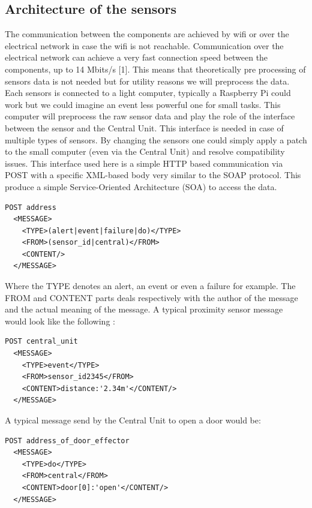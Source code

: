 \documentclass{acm_proc_article-sp}
\begin{document}
\subsection{Architecture of the sensors}
The communication between the components are achieved by wifi or over the electrical network in case the wifi is not reachable. 
Communication over the electrical network can achieve a very fast connection speed between the components, up to 14 Mbits/s [1]. 
This means that theoretically pre processing of sensors data is not needed but for utility reasons we will preprocess the data.
Each sensors is connected to a light computer, typically a Raspberry Pi could work but we could imagine an event less powerful one for small tasks. 
This computer will preprocess the raw sensor data and play the role of the interface between the sensor and the Central Unit. 
This interface is needed in case of multiple types of sensors. By changing the sensors one could simply apply a patch to the small computer (even via the Central Unit) and resolve compatibility issues. 
This interface used here is a simple HTTP based communication via POST with a  specific XML-based body very similar to the SOAP protocol.
This produce a simple Service-Oriented Architecture (SOA) to access the data.
\begin{verbatim}
POST address 
  <MESSAGE>
    <TYPE>(alert|event|failure|do)</TYPE>
    <FROM>(sensor_id|central)</FROM>
    <CONTENT/>
  </MESSAGE>
\end{verbatim}
Where the TYPE denotes an alert, an event or even a failure for example. 
The FROM and CONTENT parts deals respectively with the author of the message and the actual meaning of the message. 
A typical proximity sensor message would look like the following :
\begin{verbatim}
POST central_unit 
  <MESSAGE>
    <TYPE>event</TYPE>
    <FROM>sensor_id2345</FROM>
    <CONTENT>distance:'2.34m'</CONTENT/>
  </MESSAGE>
\end{verbatim}
A typical message send by the Central Unit to open a door would be:
\begin{verbatim}
POST address_of_door_effector
  <MESSAGE>
    <TYPE>do</TYPE>
    <FROM>central</FROM>
    <CONTENT>door[0]:'open'</CONTENT/>
  </MESSAGE> 
\end{verbatim}
\end{document}
